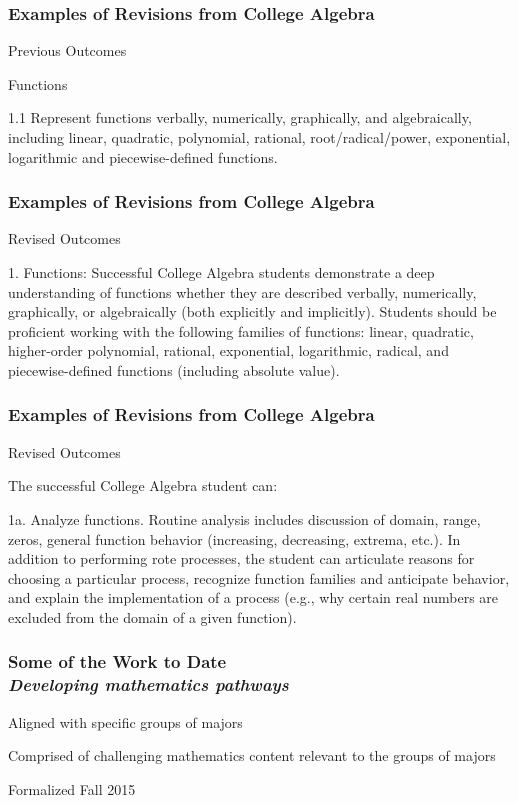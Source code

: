 \documentclass[14pt]{beamer}
\newcounter{a}
\newcounter{b}
\begin{document}
\begin{frame}
  \frametitle{Examples of Revisions from College Algebra}

  Previous Outcomes

Functions

1.1 Represent functions verbally, numerically, graphically, and algebraically, including linear, quadratic, polynomial, rational, root/radical/power, exponential, logarithmic and piecewise-defined functions.
\end{frame}

\begin{frame}
  \frametitle{Examples of Revisions from College Algebra}

  Revised Outcomes

1. Functions: Successful College Algebra students demonstrate a deep understanding of functions whether they are described verbally, numerically, graphically, or algebraically (both explicitly and implicitly).  Students should be proficient working with the following families of functions:  linear, quadratic, higher-order polynomial, rational, exponential, logarithmic, radical, and piecewise-defined functions (including absolute value).    

\end{frame}

\begin{frame}
  \frametitle{Examples of Revisions from College Algebra}

  Revised Outcomes

The successful College Algebra student can: 
 
1a. Analyze functions.  Routine analysis includes discussion of domain, range, zeros, general function behavior (increasing, decreasing, extrema, etc.).  In addition to performing rote processes, the student can articulate reasons for choosing a particular process, recognize function families and anticipate behavior, and explain the implementation of a process (e.g., why certain real numbers are excluded from the domain of a given function).
  
\end{frame}

\begin{frame}
  \frametitle{Some of the Work to Date \\
\textit{Developing mathematics pathways}}

Aligned with specific groups of majors

Comprised of challenging mathematics content relevant to the groups of majors

\vfill\hfill\textcolor{dark}{\footnotesize Formalized Fall 2015}
\end{frame}
\end{document}
